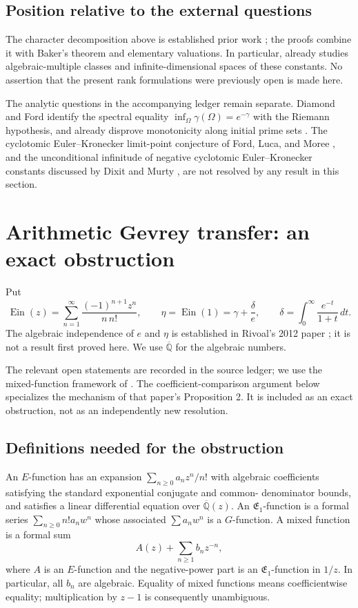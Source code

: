\documentclass[11pt,a4paper]{article}
\theoremstyle{definition}
\theoremstyle{remark}
\numberwithin{equation}{section}
\begin{document}
\subsection{Position relative to the external questions}
\label{p1:nt-position}

The character decomposition above is established prior work
\cite{p1:GMS2016}; the proofs combine it with Baker's theorem
\cite{p1:Baker1966} and elementary valuations.  In particular,
\cite[Theorems~8--9]{p1:GMS2016} already studies algebraic-multiple
classes and infinite-dimensional spaces of these constants.  No
assertion that the present rank formulations were previously open is
made here.

The analytic questions in the accompanying ledger remain separate.
Diamond and Ford identify the spectral equality
$\inf_\Omega\gamma(\Omega)=e^{-\gamma}$ with the Riemann hypothesis,
and already disprove monotonicity along initial prime sets
\cite{p1:DiamondFord2008}.  The cyclotomic Euler--Kronecker limit-point
conjecture of Ford, Luca, and Moree \cite{p1:FordLucaMoree2014}, and the
unconditional infinitude of negative cyclotomic Euler--Kronecker
constants discussed by Dixit and Murty \cite{p1:DixitMurty2023}, are
not resolved by any result in this section.

\section{Arithmetic Gevrey transfer: an exact obstruction}

Put
\[
 \operatorname{Ein}(z)=\sum_{n=1}^{\infty}\frac{(-1)^{n+1}z^n}{n\,n!},
 \qquad \eta=\operatorname{Ein}(1)=\gamma+\frac{\delta}{e},
 \qquad \delta=\int_0^\infty\frac{e^{-t}}{1+t}\,dt.
\]
The algebraic independence of $e$ and $\eta$ is established in Rivoal's
2012 paper \cite[Section 5]{p1:Rivoal2012}; it is not a result first
proved here. We use $\overline{\mathbb Q}$ for the algebraic numbers.

The relevant open statements are recorded in the source ledger;
we use the mixed-function framework of \cite{p1:FischlerRivoal2024}.
The coefficient-comparison argument below specializes the mechanism
of that paper's Proposition 2. It is included as an exact obstruction,
not as an independently new resolution.

\subsection{Definitions needed for the obstruction}
An $E$-function has an expansion $\sum_{n\geq0}a_nz^n/n!$ with algebraic
coefficients satisfying the standard exponential conjugate and common-
denominator bounds, and satisfies a linear differential equation over
$\overline{\mathbb Q}(z)$. An $\mathfrak E_1$-function is a formal
series $\sum_{n\geq0}n!a_nw^n$ whose associated $\sum a_nw^n$ is a
$G$-function. A mixed function is a formal sum
\[
 A(z)+\sum_{n\geq1}b_nz^{-n},
\]
where $A$ is an $E$-function and the negative-power part is an
$\mathfrak E_1$-function in $1/z$. In particular, all $b_n$ are
algebraic. Equality of mixed functions means coefficientwise equality;
multiplication by $z-1$ is consequently unambiguous.
\end{document}
